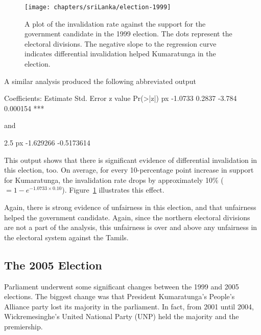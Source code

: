 \begin{figure}[t]
\texttt{[image: chapters/sriLanka/election-1999]}
\caption[Invalidation plot for the 1999 presidential election]{A plot of the invalidation rate against the support for the government candidate in the 1999 election. The dots represent the electoral divisions. The negative slope to the regression curve indicates differential invalidation helped Kumaratunga in the election.}
\label{fig:sri-elx1999}
\end{figure}

A similar analysis produced the following abbreviated output

\begin{codeout}
Coefficients:
              Estimate Std. Error z value Pr(>|z|)
px             -1.0733     0.2837  -3.784 0.000154 ***
\end{codeout}

\noindent
and

\begin{codeout}
                  2.5 %
px            -1.629266 -0.5173614
\end{codeout}

\noindent
This output shows that there is significant evidence of differential invalidation in this election, too. On average, for every 10-percentage point increase in support for Kumaratunga, the invalidation rate drops by approximately 10\% ($=1-e^{-1.0733 \times 0.10}$). Figure~\ref{fig:sri-elx1999} illustrates this effect.

Again, there is strong evidence of unfairness in this election, and that unfairness helped the government candidate. Again, since the northern electoral divisions are not a part of the analysis, this unfairness is over and above any unfairness in the electoral system against the Tamils.








\subsection{The 2005 Election}
Parliament underwent some significant changes between the 1999 and 2005 elections. The biggest change was that President Kumaratunga's People's Alliance party lost its majority in the parliament. In fact, from 2001 until 2004, Wickremesinghe's United National Party (UNP) held the majority and the premiership. 

